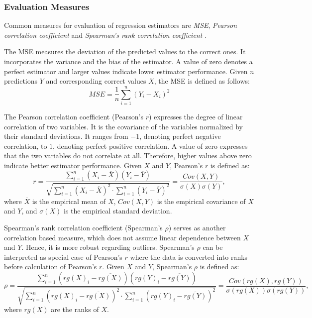 \subsubsection{Evaluation Measures} \label{sec:eval_measures}
Common measures for evaluation of regression estimators are \textit{\acl{MSE}}, \textit{Pearson correlation coefficient} \autocite{pearson_note_1895} and \textit{Spearman's rank correlation coefficient} \autocite{spearman_proof_1904}.

The \acf{MSE} measures the deviation of the predicted values to the correct ones. It incorporates the variance and the bias of the estimator. A value of zero denotes a perfect estimator and larger values indicate lower estimator performance. Given $n$ predictions $Y$ and corresponding correct values $X$, the \ac{MSE} is defined as follows:
\begin{equation} \label{eq:eval_measure_mse}
MSE = \frac{1}{n}\displaystyle\sum_{i=1}^{n} (Y_i - X_i)^2
\end{equation}

The Pearson correlation coefficient (Pearson's $r$) expresses the degree of linear correlation of two variables. It is the covariance of the variables normalized by their standard deviations. It ranges from $-1$, denoting perfect negative correlation, to $1$, denoting perfect positive correlation. A value of zero expresses that the two variables do not correlate at all. Therefore, higher values above zero indicate better estimator performance. Given $X$ and $Y$, Pearson's $r$ is defined as:
\begin{equation}
r = \frac{\sum_{i=1}^{n}(X_i - \overline{X})(Y_i - \overline{Y})}{\sqrt{\sum_{i=1}^{n}(X_i - \overline{X})^2 \cdot \sum_{i=1}^{n}(Y_i - \overline{Y})^2}} = \frac{Cov(X, Y)}{\sigma(X) \sigma(Y)},
\end{equation}
where $\overline{X}$ is the empirical mean of $X$, $Cov(X, Y)$ is the empirical covariance of $X$ and $Y$, and $\sigma(X)$ is the empirical standard deviation.

Spearman's rank correlation coefficient (Spearman's $\rho$) serves as another correlation based measure, which does not assume linear dependence between $X$ and $Y$. Hence, it is more robust regarding outliers. Spearman's $\rho$ can be interpreted as special case of Pearson's $r$ where the data is converted into ranks before calculation of Pearson's $r$. Given $X$ and $Y$, Spearman's $\rho$ is defined as:
\begin{equation}
\rho = \frac{\sum_{i=1}^{n}(rg(X)_i - \overline{rg(X)})(rg(Y)_i - \overline{rg(Y)})}{\sqrt{\sum_{i=1}^{n}(rg(X)_i - \overline{rg(X)})^2 \cdot \sum_{i=1}^{n}(rg(Y)_i - \overline{rg(Y)})^2}} = \frac{Cov({rg(X)}, {rg(Y)})}{\sigma({rg(X)})\sigma({rg(Y)})},
\end{equation}
where $rg(X)$ are the ranks of $X$. 

